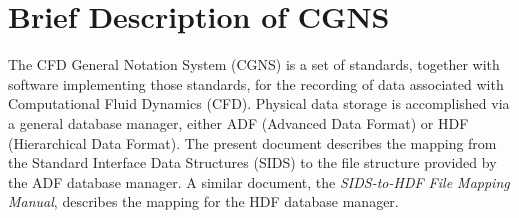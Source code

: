 \section{Brief Description of CGNS}
\label{s:brief}
\thispagestyle{plain}

The CFD General Notation System (CGNS) is a set of standards, together
with software implementing those standards, for the recording of data
associated with Computational Fluid Dynamics (CFD).
Physical data storage is accomplished via a general database manager,
either ADF (Advanced Data Format) or HDF (Hierarchical Data Format).
The present document describes the mapping from the Standard Interface
Data Structures (SIDS) to the file structure provided by the ADF
database manager.
A similar document, the \textit{SIDS-to-HDF File Mapping Manual},
describes the mapping for the HDF database manager.
